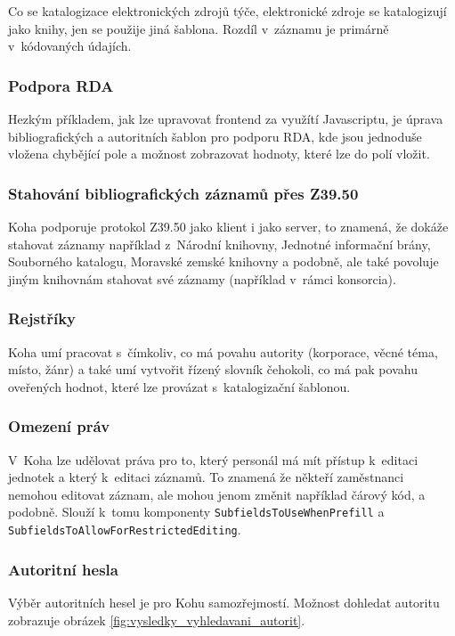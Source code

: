 \documentclass[
	11pt, oneside, printed, final, palatino, monochrome
	microtype,
	table,   %
	lof,     %
	lot     %
]{fithesis3}
\newcommand{\code}[1]{\texttt{#1}}
\begin{document}
{Co se katalogizace elektronických zdrojů týče, elektronické zdroje se katalogizují jako knihy, jen se použije jiná šablona. Rozdíl v~záznamu je primárně v~kódovaných údajích.

\subsubsection{Podpora RDA}
Hezkým příkladem, jak lze upravovat frontend za využítí Javascriptu, je úprava bibliografických a autoritních šablon pro podporu RDA, kde jsou jednoduše vložena chybějící pole a možnost zobrazovat hodnoty, které lze do polí vložit.

\subsubsection{Stahování bibliografických záznamů přes Z39.50}
Koha podporuje protokol Z39.50 jako klient i jako server, to znamená, že dokáže stahovat záznamy například z~Národní knihovny, Jednotné informační brány, Souborného katalogu, Moravské zemské knihovny a podobně, ale také povoluje jiným knihovnám stahovat své záznamy (například v~rámci konsorcia).

\subsubsection{Rejstříky}
Koha umí pracovat s~čímkoliv, co má povahu autority (korporace, věcné téma, místo, žánr) a také umí vytvořit řízený slovník čehokoli, co má pak povahu oveřených hodnot, které lze provázat s~katalogizační šablonou.

\subsubsection{Omezení práv}
V~Koha lze udělovat práva pro to, který personál má mít přístup k~editaci jednotek a který k~editaci záznamů. To znamená že někteří zaměstnanci nemohou editovat záznam, ale mohou jenom změnit například čárový kód, a podobně. Slouží k~tomu komponenty \code{SubfieldsToUseWhenPrefill} a \code{SubfieldsToAllowForRestrictedEditing}.

\subsubsection{Autoritní hesla}
Výběr autoritních hesel je pro Kohu samozřejmostí. Možnost dohledat autoritu zobrazuje obrázek \ref{fig:vysledky_vyhledavani_autorit}.

}
\end{document}
